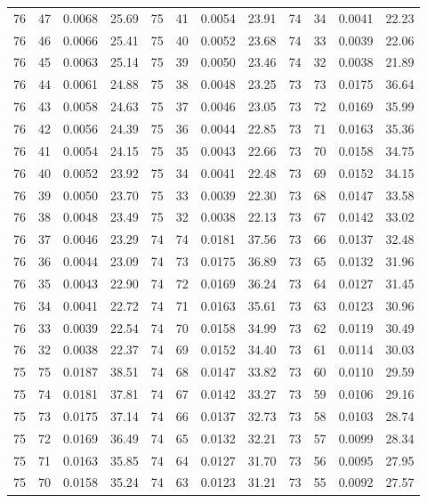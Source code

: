 \begin{tabular}{llll|llll|llll}
76 & 47 & 0.0068 & 25.69 & 75 & 41 & 0.0054 & 23.91 & 74 & 34 & 0.0041 & 22.23\\
76 & 46 & 0.0066 & 25.41 & 75 & 40 & 0.0052 & 23.68 & 74 & 33 & 0.0039 & 22.06\\
76 & 45 & 0.0063 & 25.14 & 75 & 39 & 0.0050 & 23.46 & 74 & 32 & 0.0038 & 21.89\\
76 & 44 & 0.0061 & 24.88 & 75 & 38 & 0.0048 & 23.25 & 73 & 73 & 0.0175 & 36.64\\
76 & 43 & 0.0058 & 24.63 & 75 & 37 & 0.0046 & 23.05 & 73 & 72 & 0.0169 & 35.99\\
76 & 42 & 0.0056 & 24.39 & 75 & 36 & 0.0044 & 22.85 & 73 & 71 & 0.0163 & 35.36\\
76 & 41 & 0.0054 & 24.15 & 75 & 35 & 0.0043 & 22.66 & 73 & 70 & 0.0158 & 34.75\\
76 & 40 & 0.0052 & 23.92 & 75 & 34 & 0.0041 & 22.48 & 73 & 69 & 0.0152 & 34.15\\
76 & 39 & 0.0050 & 23.70 & 75 & 33 & 0.0039 & 22.30 & 73 & 68 & 0.0147 & 33.58\\
76 & 38 & 0.0048 & 23.49 & 75 & 32 & 0.0038 & 22.13 & 73 & 67 & 0.0142 & 33.02\\
76 & 37 & 0.0046 & 23.29 & 74 & 74 & 0.0181 & 37.56 & 73 & 66 & 0.0137 & 32.48\\
76 & 36 & 0.0044 & 23.09 & 74 & 73 & 0.0175 & 36.89 & 73 & 65 & 0.0132 & 31.96\\
76 & 35 & 0.0043 & 22.90 & 74 & 72 & 0.0169 & 36.24 & 73 & 64 & 0.0127 & 31.45\\
76 & 34 & 0.0041 & 22.72 & 74 & 71 & 0.0163 & 35.61 & 73 & 63 & 0.0123 & 30.96\\
76 & 33 & 0.0039 & 22.54 & 74 & 70 & 0.0158 & 34.99 & 73 & 62 & 0.0119 & 30.49\\
76 & 32 & 0.0038 & 22.37 & 74 & 69 & 0.0152 & 34.40 & 73 & 61 & 0.0114 & 30.03\\
75 & 75 & 0.0187 & 38.51 & 74 & 68 & 0.0147 & 33.82 & 73 & 60 & 0.0110 & 29.59\\
75 & 74 & 0.0181 & 37.81 & 74 & 67 & 0.0142 & 33.27 & 73 & 59 & 0.0106 & 29.16\\
75 & 73 & 0.0175 & 37.14 & 74 & 66 & 0.0137 & 32.73 & 73 & 58 & 0.0103 & 28.74\\
75 & 72 & 0.0169 & 36.49 & 74 & 65 & 0.0132 & 32.21 & 73 & 57 & 0.0099 & 28.34\\
75 & 71 & 0.0163 & 35.85 & 74 & 64 & 0.0127 & 31.70 & 73 & 56 & 0.0095 & 27.95\\
75 & 70 & 0.0158 & 35.24 & 74 & 63 & 0.0123 & 31.21 & 73 & 55 & 0.0092 & 27.57\\

\end{tabular}
